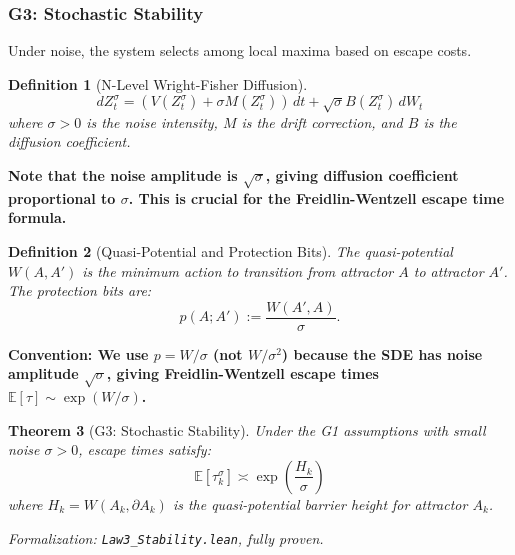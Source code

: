 \documentclass[12pt]{article}
\newtheorem{theorem}{Theorem}[section]
\newtheorem{definition}[theorem]{Definition}
\newcommand{\E}{\mathbb{E}}
\newcommand{\added}[1]{\textbf{#1}}
\begin{document}
\subsubsection{G3: Stochastic Stability}

Under noise, the system selects among local maxima based on escape costs.

\begin{definition}[N-Level Wright-Fisher Diffusion]
\[
dZ_t^\sigma = (V(Z_t^\sigma) + \sigma M(Z_t^\sigma)) \, dt + \sqrt{\sigma} B(Z_t^\sigma) \, dW_t
\]
where $\sigma > 0$ is the noise intensity, $M$ is the drift correction, and $B$ is the diffusion coefficient.
\end{definition}

\added{\textbf{Note that the noise amplitude is $\sqrt{\sigma}$, giving diffusion coefficient proportional to $\sigma$. This is crucial for the Freidlin-Wentzell escape time formula.}}

\begin{definition}[Quasi-Potential and Protection Bits]
The \emph{quasi-potential} $W(A, A')$ is the minimum action to transition from attractor $A$ to attractor $A'$. The \emph{protection bits} are:
\[
p(A; A') := \frac{W(A', A)}{\sigma}.
\]
\end{definition}

\added{\textbf{Convention: We use $p = W/\sigma$ (not $W/\sigma^2$) because the SDE has noise amplitude $\sqrt{\sigma}$, giving Freidlin-Wentzell escape times $\E[\tau] \sim \exp(W/\sigma)$.}}

\begin{theorem}[G3: Stochastic Stability]
\label{thm:g3}
Under the G1 assumptions with small noise $\sigma > 0$, escape times satisfy:
\[
\E[\tau_k^\sigma] \asymp \exp\left( \frac{H_k}{\sigma} \right)
\]
where $H_k = W(A_k, \partial A_k)$ is the quasi-potential barrier height for attractor $A_k$.
\end{theorem}
\noindent\textit{Formalization: \texttt{Law3\_Stability.lean}, fully proven.}
\end{document}
